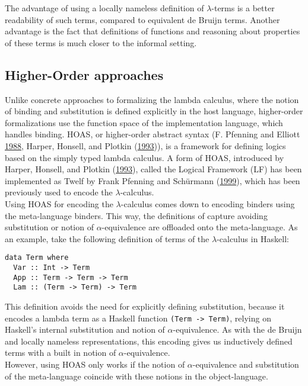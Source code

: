 \documentclass[a4paper, 12pt, twoside]{style/ociamthesis}
\let\OldTexttt\texttt
\renewcommand{\texttt}[1]{\small\OldTexttt{#1}}
\begin{document}
The advantage of using a locally nameless definition of
\(\lambda\)-terms is a better readability of such terms, compared to
equivalent de Bruijn terms. Another advantage is the fact that
definitions of functions and reasoning about properties of these terms
is much closer to the informal setting.

\subsection{Higher-Order approaches}\label{higher-order-approaches}

Unlike concrete approaches to formalizing the lambda calculus, where the
notion of binding and substitution is defined explicitly in the host
language, higher-order formalizations use the function space of the
implementation language, which handles binding. HOAS, or higher-order
abstract syntax (F. Pfenning and Elliott
\protect\hyperlink{ref-pfenning88}{1988}, Harper, Honsell, and Plotkin
(\protect\hyperlink{ref-harper93}{1993})), is a framework for defining
logics based on the simply typed lambda calculus. A form of HOAS,
introduced by Harper, Honsell, and Plotkin
(\protect\hyperlink{ref-harper93}{1993}), called the Logical Framework
(LF) has been implemented as Twelf by Frank Pfenning and Schürmann
(\protect\hyperlink{ref-pfenning99}{1999}), which has been previously
used to encode the \(\lambda\)-calculus.\\
Using HOAS for encoding the \(\lambda\)-calculus comes down to encoding
binders using the meta-language binders. This way, the definitions of
capture avoiding substitution or notion of \(\alpha\)-equivalence are
offloaded onto the meta-language. As an example, take the following
definition of terms of the \(\lambda\)-calculus in Haskell:

\begin{verbatim}
data Term where
  Var :: Int -> Term
  App :: Term -> Term -> Term
  Lam :: (Term -> Term) -> Term
\end{verbatim}

This definition avoids the need for explicitly defining substitution,
because it encodes a lambda term as a Haskell function
\texttt{(Term -> Term)}, relying on Haskell's internal substitution and
notion of \(\alpha\)-equivalence. As with the de Bruijn and locally
nameless representations, this encoding gives us inductively defined
terms with a built in notion of \(\alpha\)-equivalence.\\
However, using HOAS only works if the notion of \(\alpha\)-equivalence
and substitution of the meta-language coincide with these notions in the
object-language.
\end{document}
